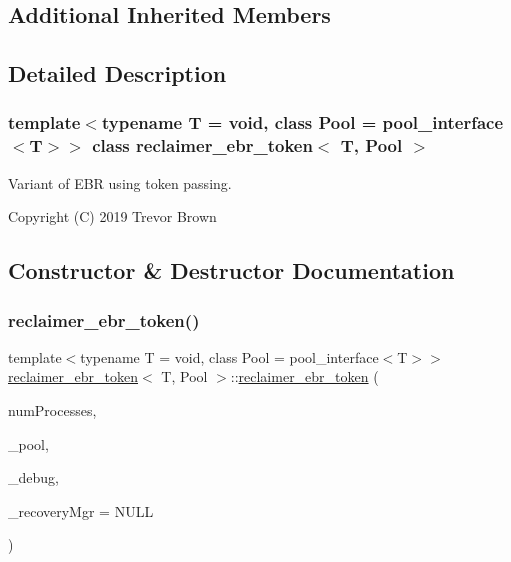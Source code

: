 \subsection*{Additional Inherited Members}


\subsection{Detailed Description}
\subsubsection*{template$<$typename T = void, class Pool = pool\+\_\+interface$<$\+T$>$$>$\newline
class reclaimer\+\_\+ebr\+\_\+token$<$ T, Pool $>$}

Variant of E\+BR using token passing.

Copyright (C) 2019 Trevor Brown 

\subsection{Constructor \& Destructor Documentation}
\mbox{\label{classreclaimer__ebr__token_a29abde36eba704625cfdc65ec2896373}} 
\subsubsection{\texorpdfstring{reclaimer\+\_\+ebr\+\_\+token()}{reclaimer\_ebr\_token()}}
{\footnotesize\ttfamily template$<$typename T  = void, class Pool  = pool\+\_\+interface$<$\+T$>$$>$ \\
\hyperlink{classreclaimer__ebr__token}{reclaimer\+\_\+ebr\+\_\+token}$<$ T, Pool $>$\+::\hyperlink{classreclaimer__ebr__token}{reclaimer\+\_\+ebr\+\_\+token} (\begin{DoxyParamCaption}\item[{const int}]{num\+Processes,  }\item[{Pool $\ast$}]{\+\_\+pool,  }\item[{\hyperlink{classdebugInfo}{debug\+Info} $\ast$const}]{\+\_\+debug,  }\item[{\hyperlink{classRecoveryMgr}{Recovery\+Mgr}$<$ void $\ast$$>$ $\ast$const}]{\+\_\+recovery\+Mgr = {\ttfamily NULL} }\end{DoxyParamCaption})\hspace{0.3cm}{\ttfamily [inline]}}

